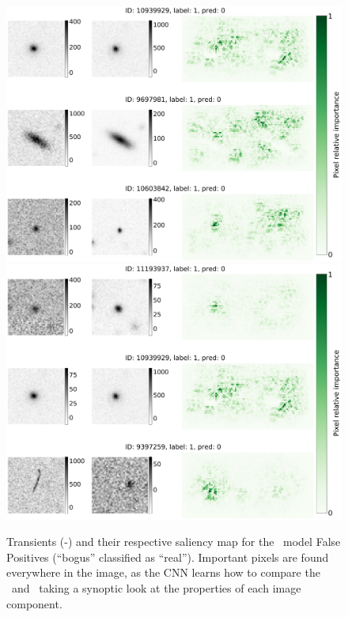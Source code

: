 \begin{figure}
    \centering
    \includegraphics[width=0.76\linewidth]{
    figures/saliency_plot_other3nodiaFP-see18.pdf}
    \includegraphics[width=0.76\linewidth]{
    figures/saliency_plot_other3nodiaFP-see854.pdf}
    \caption{Transients (\search-\temp) and their respective saliency map for the \nodia\ model False Positives (``bogus''  classified as ``real''). Important pixels are found everywhere in the image, as the CNN learns how to compare the \diff\ and \temp\ taking a synoptic look at the properties of each image component.}
    \label{fig:fpndia}
\end{figure}